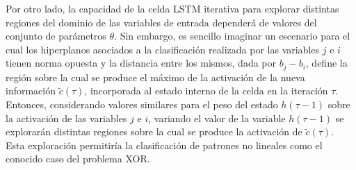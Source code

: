 \documentclass{article}
\begin{document}
	Por otro lado, la capacidad de la celda LSTM iterativa para explorar distintas regiones del dominio de las variables de entrada dependerá de valores del conjunto de parámetros $\theta$. Sin embargo, es sencillo imaginar un escenario para el cual los hiperplanos asociados a la clasificación realizada por las variables $j$ e $i$ tienen norma opuesta y la distancia entre los mismos, dada por $b_j - b_i$, define la región sobre la cual se produce el máximo de la activación de la nueva información $\tilde{c}(\tau)$, incorporada al estado interno de la celda en la iteración $\tau$. Entonces, considerando valores similares para el peso del estado $h(\tau-1)$ sobre la activación de las variables $j$ e $i$, variando el valor de la variable $h(\tau-1)$ se explorarán distintas regiones sobre la cual se produce la activación de $\tilde{c}(\tau)$. Esta exploración permitiría la clasificación de patrones no lineales como el conocido caso del problema XOR\cite{33TimeXORElman}.\\
	
\end{document}
